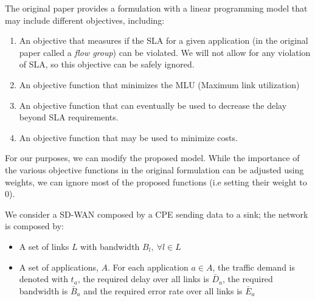 	The original paper provides a formulation with a linear programming model that may include different objectives, including:
	
	\begin{enumerate}
		\item An objective that measures if the SLA for a given application (in the original paper called a \textit{flow group}) can be violated. We will not allow for any violation of SLA, so this objective can be safely ignored.
		\item An objective function that minimizes the MLU (Maximum link utilization)
		\item An objective function that can eventually be used to decrease the delay beyond SLA requirements.
		\item An objective function that may be used to minimize costs.
	\end{enumerate}
	
	For our purposes, we can  modify the proposed model. While the importance of the various objective functions in the original formulation can be adjusted using weights, we can ignore most of the proposed functions (i.e setting their weight to 0).
	
	We consider a SD-WAN composed by a CPE sending data to a sink; the network is composed by:
	\begin{itemize}
		\item A set of links $L$ with bandwidth $B_l, \ \forall l \in L$
		\item A set of applications, $A$. For each application $a \in A$, the traffic demand is denoted with $t_a$, the required delay over all links is $\bar{D}_a$, the required bandwidth is $\bar{B}_a$ and the required error rate over all links is $\bar{E}_a$
	\end{itemize}
	
